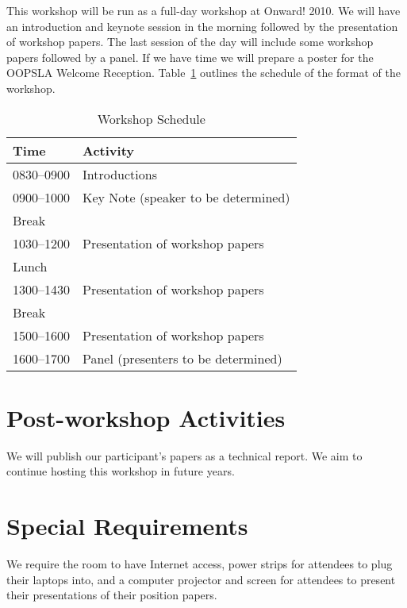 \documentclass{sigplanconf}
\begin{document}
This workshop will be run as a full-day workshop at Onward! 2010.  We
will have an introduction and keynote session in the morning followed
by the presentation of workshop papers.  The last session of the day
will include some workshop papers followed by a panel. 
If we have time we will prepare a poster for the
OOPSLA Welcome Reception.  Table~\ref{tab:schedule} outlines the
schedule of the format of the workshop.


\begin{table} [!htbp] %
\begin{tabularx}{\columnwidth}{l|X}
\textbf{Time}   & \textbf{Activity} \\
\hline
0830--0900    & Introductions \vspace{1mm} \\
0900--1000    & Key Note (speaker to be determined) \vspace{1mm} \\
Break              & ~\vspace{1mm}\\
1030--1200   & Presentation of workshop papers \vspace{1mm}\\
Lunch             & ~\vspace{1mm}\\
1300--1430   & Presentation of workshop papers \vspace{1mm}\\
Break              & ~\vspace{1mm}\\
1500--1600    & Presentation of workshop papers \vspace{1mm}\\
1600--1700    & Panel (presenters to be determined) \\

\end{tabularx}
\caption{Workshop Schedule}
\label{tab:schedule}
\end{table}

\section{Post-workshop Activities}

We will publish our participant's papers as a technical report.
We aim to continue hosting this workshop in future years.

\section{Special Requirements}

We require the room to have Internet access, power strips for
attendees to plug their laptops into, and a computer projector and
screen for attendees to present their presentations of their position
papers.
\end{document}
